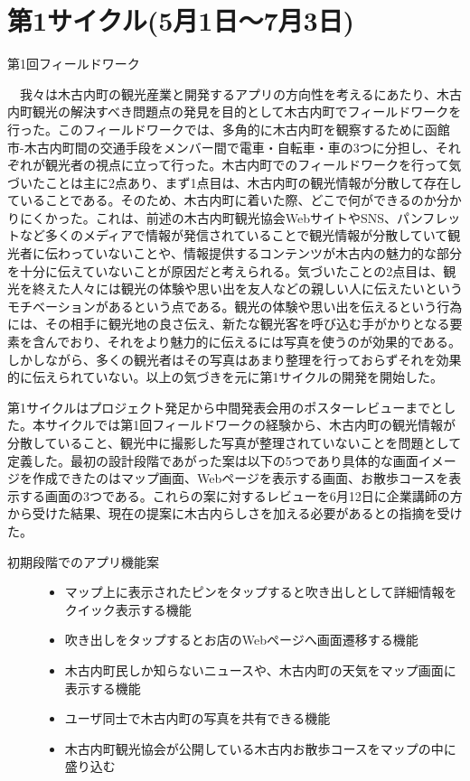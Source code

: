 \section{第1サイクル(5月1日〜7月3日)}

\begin{description}
\item[第1回フィールドワーク]\mbox{}
\end{description}
　我々は木古内町の観光産業と開発するアプリの方向性を考えるにあたり、木古内町観光の解決すべき問題点の発見を目的として木古内町でフィールドワークを行った。このフィールドワークでは、多角的に木古内町を観察するために函館市-木古内町間の交通手段をメンバー間で電車・自転車・車の3つに分担し、それぞれが観光者の視点に立って行った。木古内町でのフィールドワークを行って気づいたことは主に2点あり、まず1点目は、木古内町の観光情報が分散して存在していることである。そのため、木古内町に着いた際、どこで何ができるのか分かりにくかった。これは、前述の木古内町観光協会WebサイトやSNS、パンフレットなど多くのメディアで情報が発信されていることで観光情報が分散していて観光者に伝わっていないことや、情報提供するコンテンツが木古内の魅力的な部分を十分に伝えていないことが原因だと考えられる。気づいたことの2点目は、観光を終えた人々には観光の体験や思い出を友人などの親しい人に伝えたいというモチベーションがあるという点である。観光の体験や思い出を伝えるという行為には、その相手に観光地の良さ伝え、新たな観光客を呼び込む手がかりとなる要素を含んでおり、それをより魅力的に伝えるには写真を使うのが効果的である。しかしながら、多くの観光者はその写真はあまり整理を行っておらずそれを効果的に伝えられていない。以上の気づきを元に第1サイクルの開発を開始した。

第1サイクルはプロジェクト発足から中間発表会用のポスターレビューまでとした。本サイクルでは第1回フィールドワークの経験から、木古内町の観光情報が分散していること、観光中に撮影した写真が整理されていないことを問題として定義した。最初の設計段階であがった案は以下の5つであり具体的な画面イメージを作成できたのはマップ画面、Webページを表示する画面、お散歩コースを表示する画面の3つである。これらの案に対するレビューを6月12日に企業講師の方から受けた結果、現在の提案に木古内らしさを加える必要があるとの指摘を受けた。
\begin{description}
\item[初期段階でのアプリ機能案]\mbox{}
\begin{itemize}
 \item マップ上に表示されたピンをタップすると吹き出しとして詳細情報をクイック表示する機能
 \item 吹き出しをタップするとお店のWebページへ画面遷移する機能
 \item 木古内町民しか知らないニュースや、木古内町の天気をマップ画面に表示する機能
 \item ユーザ同士で木古内町の写真を共有できる機能
 \item 木古内町観光協会が公開している木古内お散歩コースをマップの中に盛り込む
\end{itemize}
\end{description}


